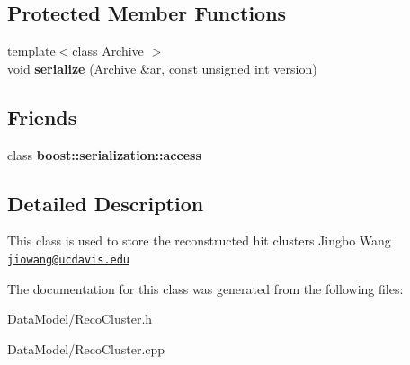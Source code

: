 \subsection*{Protected Member Functions}
\begin{DoxyCompactItemize}
\item 
\hypertarget{classRecoCluster_acec2d2b252bbb6dc1996b8531e3b8d16}{{\footnotesize template$<$class Archive $>$ }\\void {\bfseries serialize} (Archive \&ar, const unsigned int version)}\label{classRecoCluster_acec2d2b252bbb6dc1996b8531e3b8d16}

\end{DoxyCompactItemize}
\subsection*{Friends}
\begin{DoxyCompactItemize}
\item 
\hypertarget{classRecoCluster_ac98d07dd8f7b70e16ccb9a01abf56b9c}{class {\bfseries boost\-::serialization\-::access}}\label{classRecoCluster_ac98d07dd8f7b70e16ccb9a01abf56b9c}

\end{DoxyCompactItemize}


\subsection{Detailed Description}
This class is used to store the reconstructed hit clusters Jingbo Wang \href{mailto:jiowang@ucdavis.edu}{\tt jiowang@ucdavis.\-edu} 

The documentation for this class was generated from the following files\-:\begin{DoxyCompactItemize}
\item 
Data\-Model/Reco\-Cluster.\-h\item 
Data\-Model/Reco\-Cluster.\-cpp\end{DoxyCompactItemize}
